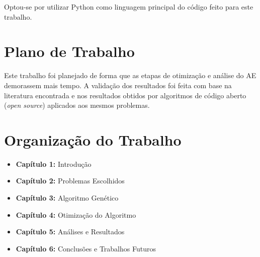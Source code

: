 Optou-se por utilizar Python como linguagem principal do código feito para este trabalho.

\section{Plano de Trabalho}
\label{sec:plano_trabalho}

Este trabalho foi planejado de forma que as etapas de otimização e análise do AE demorassem mais tempo. A validação dos resultados foi feita com base na literatura encontrada e nos resultados obtidos por algoritmos de código aberto (\emph{open source}) aplicados aos mesmos problemas.

\section{Organização do Trabalho}

\begin{itemize}
	\item \textbf{Capítulo 1:} Introdução
	\item \textbf{Capítulo 2:} Problemas Escolhidos
	\item \textbf{Capítulo 3:} Algoritmo Genético
	\item \textbf{Capítulo 4:} Otimização do Algoritmo
	\item \textbf{Capítulo 5:} Análises e Resultados
	\item \textbf{Capítulo 6:} Conclusões e Trabalhos Futuros
\end{itemize}
